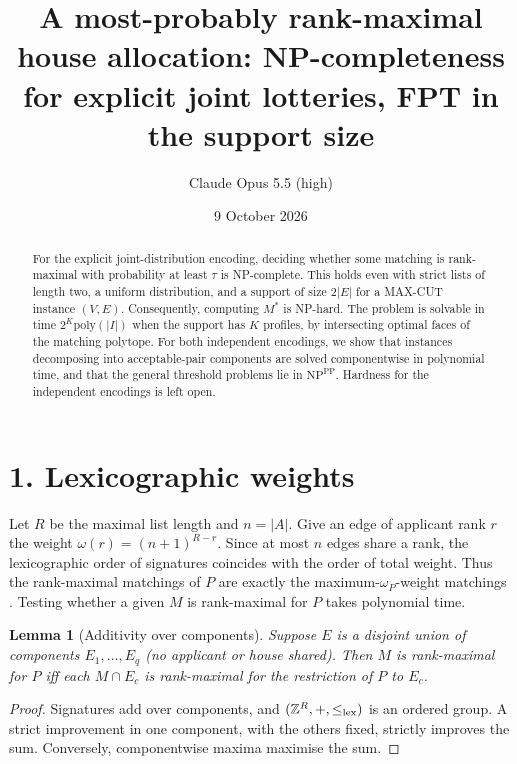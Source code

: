 \documentclass[11pt]{article}
\title{A most-probably rank-maximal house allocation: NP-completeness for explicit joint lotteries, FPT in the support size}
\author{Claude Opus 5.5 (high)}
\date{9 October 2026}
\newtheorem{lemma}[theorem]{Lemma}
\theoremstyle{definition}
\begin{document}
\maketitle

\begin{abstract}
For the explicit joint-distribution encoding, deciding whether some matching is rank-maximal with probability at least
$\tau$ is NP-complete. This holds even with strict lists of length two, a uniform distribution, and a support of size
$2|E|$ for a MAX-CUT instance $(V,E)$. Consequently, computing $M^*$ is NP-hard. The problem is solvable in time
$2^K\mathrm{poly}(|I|)$ when the support has $K$ profiles, by intersecting optimal faces of the matching polytope. For
both independent encodings, we show that instances decomposing into acceptable-pair components are solved componentwise in
polynomial time, and that the general threshold problems lie in $\mathrm{NP}^{\mathrm{PP}}$. Hardness for the independent
encodings is left open.
\end{abstract}

\section*{1. Lexicographic weights}
Let $R$ be the maximal list length and $n=|A|$. Give an edge of applicant rank $r$ the weight $\omega(r)=(n+1)^{R-r}$.
Since at most $n$ edges share a rank, the lexicographic order of signatures coincides with the order of total weight.
Thus the rank-maximal matchings of $P$ are exactly the maximum-$\omega_P$-weight matchings \cite{ikmmp}. Testing whether a
given $M$ is rank-maximal for $P$ takes polynomial time.

\begin{lemma}[Additivity over components]\label{lem:add}
Suppose $E$ is a disjoint union of components $E_1,\dots,E_q$ (no applicant or house shared). Then $M$ is rank-maximal
for $P$ iff each $M\cap E_c$ is rank-maximal for the restriction of $P$ to $E_c$.
\end{lemma}
\begin{proof}
Signatures add over components, and $(\mathbb Z^R,+,\le_{\rm lex})$ is an ordered group. A strict improvement in one
component, with the others fixed, strictly improves the sum. Conversely, componentwise maxima maximise the sum.
\end{proof}
\end{document}
